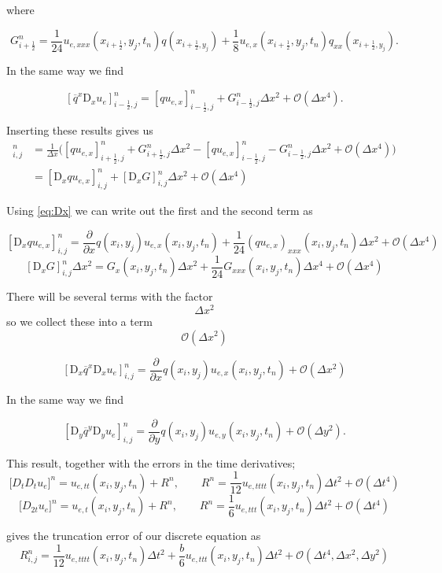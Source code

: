 \documentclass[a4paper, 11pt, notitlepage, english]{article}
\newcommand{\p}{\partial}
\newcommand{\D}{\mbox{D}}
\begin{document}
where

$$G^n_{i+\frac{1}{2}} = \frac{1}{24}{u_{e, xxx}}(x_{i+\frac{1}{2}},y_j,t_n)q(x_{i+\frac{1}{2},y_j}) + \frac{1}{8}{u_{e, x}}(x_{i+\frac{1}{2}},y_j,t_n)
q_{xx}(x_{i+\frac{1}{2},y_j}).$$

In the same way we find

$$[\overline{q}^x\D_xu_e]^n_{i-\frac{1}{2},j} = [qu_{e,x}]^n_{i-\frac{1}{2},j} + G^n_{i-\frac{1}{2},j}\Delta x^2 + \mathcal{O}(\Delta x^4).$$

Inserting these results gives us
\begin{align*}
 [\D_x\overline{q}^x\D_xu_e]^n_{i,j} &= \frac{1}{\Delta x}\bigg([qu_{e,x}]^n_{i+\frac{1}{2},j} + 
 G^n_{i+\frac{1}{2},j}\Delta x^2-[qu_{e,x}]^n_{i-\frac{1}{2},j} - G^n_{i-\frac{1}{2},j}\Delta x^2 + \mathcal{O}(\Delta x^4)\bigg)\\
 &= [\D_xqu_{e,x}]^n_{i,j} + [\D_xG]^n_{i,j}\Delta x^2 + \mathcal{O}(\Delta x^4)
\end{align*}

Using \ref{eq:Dx} we can write out the first and the second term as

$$ [\D_xqu_{e,x}]^n_{i,j} = \frac{\p}{\p x}q(x_i,y_j)u_{e,x}(x_i,y_j,t_n) + \frac{1}{24}(qu_{e,x})_{xxx}(x_i,y_j,t_n)\Delta x^2 + \mathcal{O}(\Delta x^4)$$
$$ [\D_xG]^n_{i,j}\Delta x^2 = G_x(x_i,y_j,t_n)\Delta x^2 + \frac{1}{24} G_{xxx}(x_i,y_j,t_n)\Delta x^4 + \mathcal{O}(\Delta x^4) $$


There will be several terms with the factor $$\Delta x^2$$ so we collect these into a term $$\mathcal{O}(\Delta x^2)$$

$$[\D_x\overline{q}^x\D_xu_e]^n_{i,j} = \frac{\p}{\p x}q(x_i,y_j)u_{e,x}(x_i,y_j,t_n) + \mathcal{O}(\Delta x^2)$$

In the same way we find

$$[\D_y\overline{q}^y\D_yu_e]^n_{i,j} = \frac{\p}{\p y}q(x_i,y_j)u_{e,y}(x_i,y_j,t_n) + \mathcal{O}(\Delta y^2).$$

This result, together with the errors in the time derivatives;
$$\lbrack D_tD_t u_e \rbrack^n = u_{e,tt}(x_i,y_j,t_n) + R^n, \qquad R^n = \frac{1}{12}u_{e,tttt}(x_i,y_j,t_n)\Delta t^2 + {\mathcal{O}(\Delta t^4)}$$
$$\lbrack D_{2t}u_e \rbrack^n = u_{e,t}(x_i,y_j,t_n) + R^n, \qquad R^n = \frac{1}{6}u_{e,ttt}(x_i,y_j,t_n)\Delta t^2 + {\mathcal{O}(\Delta t^4)}$$

gives the truncation error of our discrete equation as
$$R^n_{i,j} =  \frac{1}{12}u_{e,tttt}(x_i,y_j,t_n)\Delta t^2 + \frac{b}{6}u_{e,ttt}(x_i,y_j,t_n)\Delta t^2 + \mathcal{O}(\Delta t^4,\Delta x^2, \Delta y^2)$$
\end{document}
